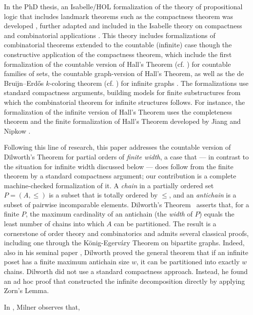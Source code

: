 \documentclass[11pt,a4paper]{article}
\begin{document}
In 
the PhD thesis, 
an Isabelle/HOL formalization of the theory of propositional logic that includes landmark theorems such as the compactness theorem was developed \cite{Serrano2011}, further adapted and included in the Isabelle theory on compactness and combinatorial applications \cite{DBLP:journals/afp/SuarezLA24}. This theory includes formalizations of combinatorial theorems extended to the countable (infinite) case though the constructive application of the compactness theorem, which include the first formalization of the countable version of Hall's Theorem (cf. \cite{Hall}) for countable families of sets, the countable graph-version of Hall's Theorem, as well as the de Bruijn--Erd\H{o}s $k$-coloring theorem (cf. \cite{deBruijnErdos1951}) for infinite graphs  \cite{Serrano2022,Serrano2024}. The formalizations use standard compactness arguments, building models for finite substructures from which the combinatorial theorem for infinite structures follows. For instance, the formalization of the infinite version of Hall's Theorem uses the completeness theorem and the finite formalization of Hall's Theorem developed by Jiang and Nipkow \cite{Marriage-AFP,DBLP:conf/cpp/JiangN11}.

Following this line of research, this paper addresses the countable version of Dilworth's Theorem for partial orders of \emph{finite width}, a case that --- in contrast to the situation for infinite width discussed below --- does follow from the finite theorem by a standard compactness argument; our contribution is a complete machine-checked formalization of it.  A \emph{chain} in a partially ordered set $P=(A,\le)$ is a subset that is totally ordered by $\le$, and an \emph{antichain} is a subset of pairwise incomparable elements. Dilworth's Theorem~\cite{Dilworth1950} asserts that, for a finite $P$, the maximum cardinality of an antichain (the \emph{width} of $P$) equals the least number of chains into which $A$ can be partitioned. The result is a cornerstone of order theory and combinatorics and admits several classical proofs, including one through the K\"onig-Egerv\'ary Theorem on bipartite graphs.  Indeed, also in his seminal paper \cite{Dilworth1950}, Dilworth proved the general theorem that if an infinite poset has a finite maximum antichain size $w$, it can be partitioned into exactly $w$ chains. Dilworth did not use a standard compactness approach. Instead, he found an ad hoc proof that constructed the infinite decomposition directly by applying Zorn's Lemma.


In \cite{Milner1990}, Milner observes that, 
\end{document}
